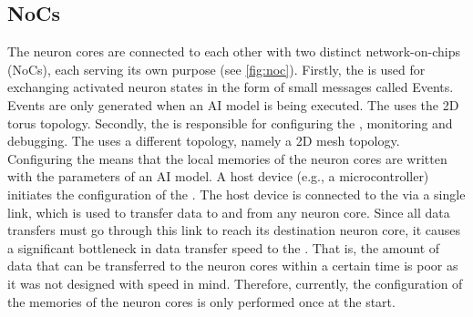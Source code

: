 \subsection{NoCs}
The neuron cores are connected to each other with two distinct network-on-chips (NoCs), each serving its own purpose (see \cref{fig:noc}).
Firstly, the \eventnoc{} is used for exchanging activated neuron states in the form of small messages called Events.
Events are only generated when an AI model is being executed.
The \eventnoc{} uses the 2D torus topology.
Secondly, the \confignoc{} is responsible for configuring the \graicore{}, monitoring and debugging.
The \confignoc{} uses a different topology, namely a 2D mesh topology.
Configuring the \graicore{} means that the local memories of the neuron cores are written with the parameters of an AI model.
A host device (e.g., a microcontroller) initiates the configuration of the \graicore{}.
The host device is connected to the \confignoc{} via a single link, which is used to transfer data to and from any neuron core.
Since all data transfers must go through this link to reach its destination neuron core, it causes a significant bottleneck in data transfer speed to the \graicore{}.
That is, the amount of data that can be transferred to the neuron cores within a certain time is poor as it was not designed with speed in mind.
Therefore, currently, the configuration of the memories of the neuron cores is only performed once at the start.

